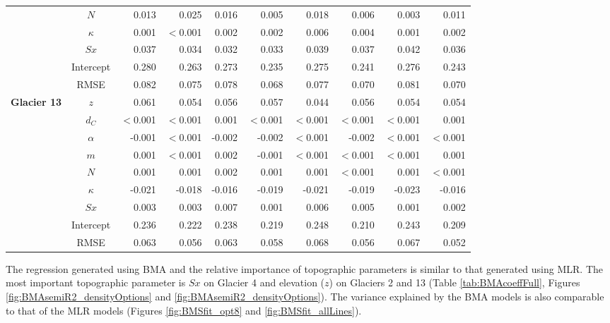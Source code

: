 \documentclass{sfuthesis}
\begin{document}
{\begin{table}
\begin{tabular}{ccrrrrrrrr}
 & $N$ & 0.013 & 0.025 & 0.016 & 0.005 & 0.018 & 0.006 & 0.003 & 0.011 \\
 & $\kappa$ & 0.001 & $<$0.001 & 0.002 & 0.002 & 0.006 & 0.004 & 0.001 & 0.002 \\
 & $Sx$ & 0.037 & 0.034 & 0.032 & 0.033 & 0.039 & 0.037 & 0.042 & 0.036 \\
 & Intercept & 0.280 & 0.263 & 0.273 & 0.235 & 0.275 & 0.241 & 0.276 & 0.243 \\
 & RMSE & 0.082 & 0.075 & 0.078 & 0.068 & 0.077 & 0.070 & 0.081 & 0.070 \\ \hline
\multirow{9}{*}{\textbf{Glacier 13}} & $z$ & 0.061 & 0.054 & 0.056 & 0.057 & 0.044 & 0.056 & 0.054 & 0.054 \\
 & $d_C$ & $<$0.001 & $<$0.001 & 0.001 & $<$0.001 & $<$0.001 & $<$0.001 & $<$0.001 & 0.001 \\
 & $\alpha$ & -0.001 & $<$0.001 & -0.002 & -0.002 & $<$0.001 & -0.002 & $<$0.001 & $<$0.001 \\
 & $m$ & 0.001 & $<$0.001 & 0.002 & -0.001 & $<$0.001 & $<$0.001 & $<$0.001 & 0.001 \\
 & $N$ & 0.001 & 0.001 & 0.002 & 0.001 & 0.001 & $<$0.001 & 0.001 & $<$0.001 \\
 & $\kappa$ & -0.021 & -0.018 & -0.016 & -0.019 & -0.021 & -0.019 & -0.023 & -0.016 \\
 & $Sx$ & 0.003 & 0.003 & 0.007 & 0.001 & 0.006 & 0.005 & 0.001 & 0.002 \\
 & Intercept & 0.236 & 0.222 & 0.238 & 0.219 & 0.248 & 0.210 & 0.243 & 0.209 \\
 & RMSE & 0.063 & 0.056 & 0.063 & 0.058 & 0.068 & 0.056 & 0.067 & 0.052
\end{tabular}
\end{table}

The regression generated using BMA and the relative importance of topographic parameters is similar to that generated using MLR. The most important topographic parameter is $Sx$ on Glacier 4 and elevation ($z$) on Glaciers 2 and 13 (Table \ref{tab:BMAcoeffFull}, Figures \ref{fig:BMAsemiR2_densityOptions} and \ref{fig:BMAsemiR2_densityOptions}). The variance explained by the BMA models is also comparable to that of the MLR models (Figures \ref{fig:BMSfit_opt8} and \ref{fig:BMSfit_allLines}). 

}
\end{document}
